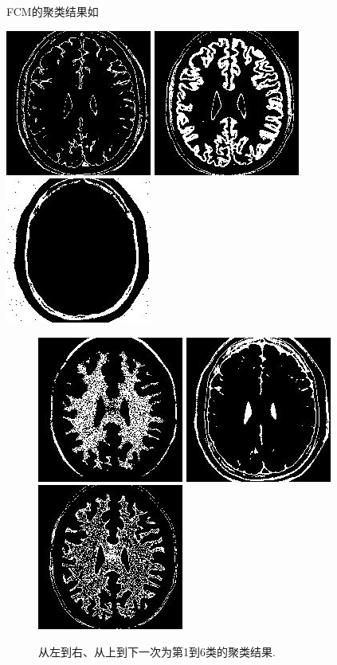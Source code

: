 \documentclass[lang=cn,11pt]{elegantpaper}
\begin{document}
FCM的聚类结果如 
\begin{center}
    \includegraphics[width=.25\textwidth]{Brain/FCM/2020-03-19_21-07-36Kind1.jpg}
    \includegraphics[width=.25\textwidth]{Brain/FCM/2020-03-19_21-07-36Kind2.jpg}
    \includegraphics[width=.25\textwidth]{Brain/FCM/2020-03-19_21-07-36Kind3.jpg}
\end{center}
\begin{figure}[ht]
    \centering
    \includegraphics[width=.25\textwidth]{Brain/FCM/2020-03-19_21-07-36Kind4.jpg}
    \includegraphics[width=.25\textwidth]{Brain/FCM/2020-03-19_21-07-36Kind5.jpg}
    \includegraphics[width=.25\textwidth]{Brain/FCM/2020-03-19_21-07-36Kind6.jpg}
    \caption{从左到右、从上到下一次为第1到6类的聚类结果. \label{fig:FCM}}
\end{figure}
\end{document}
